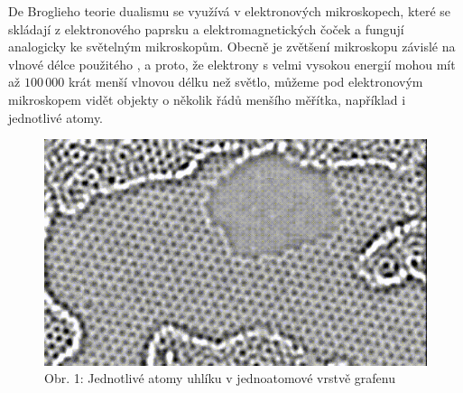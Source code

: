 \documentclass{../../../../style/mkimain}
\begin{document}
\noindent{}
\klein
De Broglieho teorie dualismu se využívá v elektronových mikroskopech, které se skládají z elektronového paprsku a
elektromagnetických čoček a fungují analogicky ke světelným mikroskopům.
Obecně je zvětšení mikroskopu závislé na vlnové délce použitého , a proto, že elektrony s velmi vysokou
energií mohou mít až $100\,000$ krát menší vlnovou délku než světlo, můžeme pod elektronovým mikroskopem vidět objekty o 
několik řádů menšího měřítka, například i jednotlivé atomy.

\begin{figure}[H]
    \begin{center}
    \includegraphics[scale=0.37]{grafen.png}\\
    \vspace{0.15cm}
        Obr. 1: Jednotlivé atomy uhlíku v jednoatomové vrstvě grafenu
    \end{center}
\end{figure}
\end{document}
